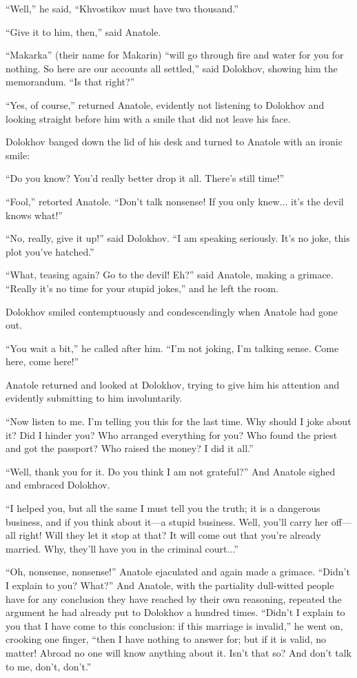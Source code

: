 ``Well,'' he said, ``Khvostikov must have two thousand.''

``Give it to him, then,'' said Anatole.

``Makarka'' (their name for Makarin) ``will go through fire and
water for you for nothing. So here are our accounts all
settled,'' said Dolokhov, showing him the memorandum. ``Is that
right?''

``Yes, of course,'' returned Anatole, evidently not listening to
Dolokhov and looking straight before him with a smile that did
not leave his face.

Dolokhov banged down the lid of his desk and turned to Anatole
with an ironic smile:

``Do you know? You'd really better drop it all. There's still
time!''

``Fool,'' retorted Anatole. ``Don't talk nonsense! If you only
knew... it's the devil knows what!''

``No, really, give it up!'' said Dolokhov. ``I am speaking
seriously. It's no joke, this plot you've hatched.''

``What, teasing again? Go to the devil! Eh?'' said Anatole,
making a grimace. ``Really it's no time for your stupid jokes,''
and he left the room.

Dolokhov smiled contemptuously and condescendingly when Anatole
had gone out.

``You wait a bit,'' he called after him. ``I'm not joking, I'm
talking sense. Come here, come here!''

Anatole returned and looked at Dolokhov, trying to give him his
attention and evidently submitting to him involuntarily.

``Now listen to me. I'm telling you this for the last time. Why
should I joke about it? Did I hinder you? Who arranged everything
for you? Who found the priest and got the passport? Who raised
the money? I did it all.''

``Well, thank you for it. Do you think I am not grateful?'' And
Anatole sighed and embraced Dolokhov.

``I helped you, but all the same I must tell you the truth; it is
a dangerous business, and if you think about it---a stupid
business. Well, you'll carry her off---all right! Will they let
it stop at that? It will come out that you're already
married. Why, they'll have you in the criminal court...''

``Oh, nonsense, nonsense!'' Anatole ejaculated and again made a
grimace.  ``Didn't I explain to you? What?'' And Anatole, with
the partiality dull-witted people have for any conclusion they
have reached by their own reasoning, repeated the argument he had
already put to Dolokhov a hundred times. ``Didn't I explain to
you that I have come to this conclusion: if this marriage is
invalid,'' he went on, crooking one finger, ``then I have nothing
to answer for; but if it is valid, no matter! Abroad no one will
know anything about it. Isn't that so? And don't talk to me,
don't, don't.''

